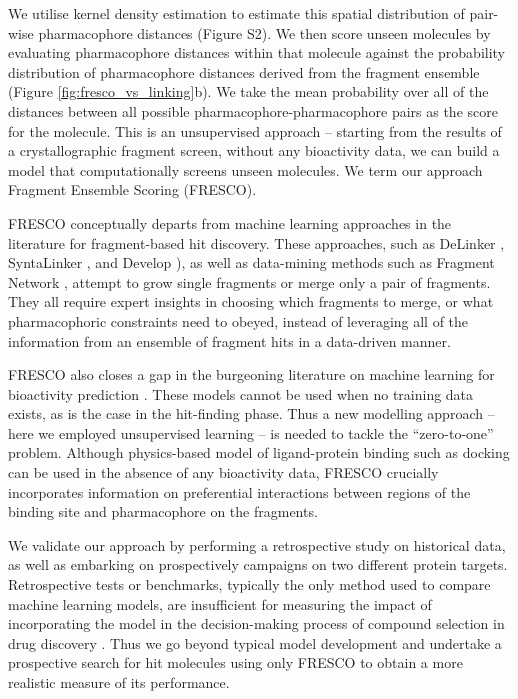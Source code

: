 
We utilise kernel density estimation \cite{Parzen1962KDE} to estimate this spatial distribution of pair-wise pharmacophore distances (Figure S2). We then score unseen molecules by evaluating pharmacophore distances within that molecule against the probability distribution of pharmacophore distances derived from the fragment ensemble (Figure \ref{fig:fresco_vs_linking}b). We take the mean probability over all of the distances between all possible pharmacophore-pharmacophore pairs as the score for the molecule. This is an unsupervised approach -- starting from the results of a crystallographic fragment screen, without any bioactivity data, we can build a model that computationally screens unseen molecules. We term our approach Fragment Ensemble Scoring (FRESCO). 

FRESCO conceptually departs from machine learning approaches in the literature for fragment-based hit discovery. These approaches, such as DeLinker \cite{Imrie2020DeLinker},  SyntaLinker \cite{Yang2020SyntaLinker}, and Develop \cite{Imrie2021Develop}), as well as data-mining methods such as Fragment Network \cite{Hall2017FragNet}, attempt to grow single fragments or merge only a pair of fragments. They all require expert insights in choosing which fragments to merge, or what pharmacophoric constraints need to obeyed, instead of leveraging all of the information from an ensemble of fragment hits in a data-driven manner.

FRESCO also closes a gap in the burgeoning literature on machine learning for bioactivity prediction \cite{muratov2020qsar}. These models cannot be used when no training data exists, as is the case in the hit-finding phase. Thus a new modelling approach -- here we employed unsupervised learning -- is needed to tackle the ``zero-to-one'' problem. Although physics-based model of ligand-protein binding such as docking \cite{Lyu2019ultra, Alon2021sigma, Fink2022Alpha} can be used in the absence of any bioactivity data, FRESCO crucially incorporates information on preferential interactions between regions of the binding site and pharmacophore on the fragments.

We validate our approach by performing a retrospective study on historical data, as well as embarking on prospectively campaigns on two different protein targets. Retrospective tests or benchmarks, typically the only method used to compare machine learning models, are insufficient for measuring the impact of incorporating the model in the decision-making process of compound selection in drug discovery \cite{Kearnes2021Prospective}. Thus we go beyond typical model development and undertake a prospective search for hit molecules using only FRESCO to obtain a more realistic measure of its performance.


